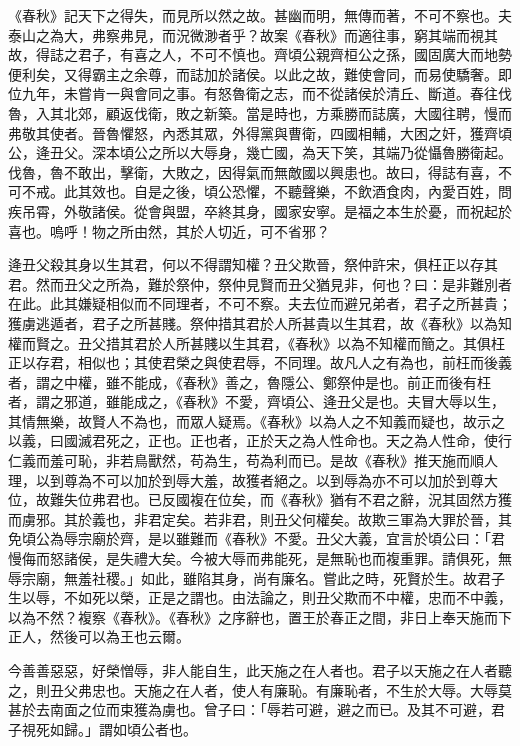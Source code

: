 《春秋》記天下之得失，而見所以然之故。甚幽而明，無傳而著，不可不察也。夫泰山之為大，弗察弗見，而況微渺者乎？故案《春秋》而適往事，窮其端而視其故，得誌之君子，有喜之人，不可不慎也。齊頃公親齊桓公之孫，國固廣大而地勢便利矣，又得霸主之余尊，而誌加於諸侯。以此之故，難使會同，而易使驕奢。即位九年，未嘗肯一與會同之事。有怒魯衛之志，而不從諸侯於清丘、斷道。春往伐魯，入其北郊，顧返伐衛，敗之新築。當是時也，方乘勝而誌廣，大國往聘，慢而弗敬其使者。晉魯懼怒，內悉其眾，外得黨與曹衛，四國相輔，大困之奸，獲齊頃公，逄丑父。深本頃公之所以大辱身，幾亡國，為天下笑，其端乃從懾魯勝衛起。伐魯，魯不敢出，擊衛，大敗之，因得氣而無敵國以興患也。故曰，得誌有喜，不可不戒。此其效也。自是之後，頃公恐懼，不聽聲樂，不飲酒食肉，內愛百姓，問疾吊霄，外敬諸侯。從會與盟，卒終其身，國家安寧。是福之本生於憂，而祝起於喜也。嗚呼！物之所由然，其於人切近，可不省邪？


逄丑父殺其身以生其君，何以不得謂知權？丑父欺晉，祭仲許宋，俱枉正以存其君。然而丑父之所為，難於祭仲，祭仲見賢而丑父猶見非，何也？曰：是非難別者在此。此其嫌疑相似而不同理者，不可不察。夫去位而避兄弟者，君子之所甚貴；獲虜逃遁者，君子之所甚賤。祭仲措其君於人所甚貴以生其君，故《春秋》以為知權而賢之。丑父措其君於人所甚賤以生其君，《春秋》以為不知權而簡之。其俱枉正以存君，相似也；其使君榮之與使君辱，不同理。故凡人之有為也，前枉而後義者，謂之中權，雖不能成，《春秋》善之，魯隱公、鄭祭仲是也。前正而後有枉者，謂之邪道，雖能成之，《春秋》不愛，齊頃公、逄丑父是也。夫冒大辱以生，其情無樂，故賢人不為也，而眾人疑焉。《春秋》以為人之不知義而疑也，故示之以義，曰國滅君死之，正也。正也者，正於天之為人性命也。天之為人性命，使行仁義而羞可恥，非若鳥獸然，苟為生，苟為利而已。是故《春秋》推天施而順人理，以到尊為不可以加於到辱大羞，故獲者絕之。以到辱為亦不可以加於到尊大位，故難失位弗君也。已反國複在位矣，而《春秋》猶有不君之辭，況其固然方獲而虜邪。其於義也，非君定矣。若非君，則丑父何權矣。故欺三軍為大罪於晉，其免頃公為辱宗廟於齊，是以雖難而《春秋》不愛。丑父大義，宜言於頃公曰：「君慢侮而怒諸侯，是失禮大矣。今被大辱而弗能死，是無恥也而複重罪。請俱死，無辱宗廟，無羞社稷。」如此，雖陷其身，尚有廉名。嘗此之時，死賢於生。故君子生以辱，不如死以榮，正是之謂也。由法論之，則丑父欺而不中權，忠而不中義，以為不然？複察《春秋》。《春秋》之序辭也，置王於春正之間，非日上奉天施而下正人，然後可以為王也云爾。


今善善惡惡，好榮憎辱，非人能自生，此天施之在人者也。君子以天施之在人者聽之，則丑父弗忠也。天施之在人者，使人有廉恥。有廉恥者，不生於大辱。大辱莫甚於去南面之位而束獲為虜也。曾子曰：「辱若可避，避之而已。及其不可避，君子視死如歸。」謂如頃公者也。



